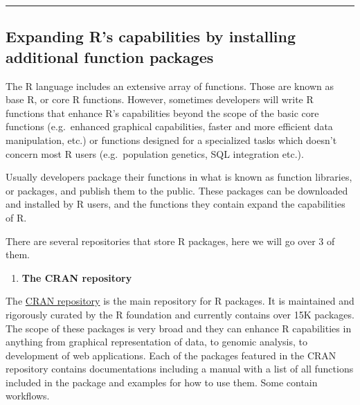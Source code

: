 \documentclass[
]{book}
\providecommand{\tightlist}{%
  \setlength{\itemsep}{0pt}\setlength{\parskip}{0pt}}
\theoremstyle{definition}
\theoremstyle{definition}
\theoremstyle{definition}
\theoremstyle{definition}
\theoremstyle{remark}
\begin{document}
\begin{center}\rule{0.5\linewidth}{0.5pt}\end{center}

\hypertarget{expanding-rs-capabilities-by-installing-additional-function-packages}{%
\subsection*{\texorpdfstring{\textbf{Expanding R's capabilities by installing additional function packages}}{Expanding R's capabilities by installing additional function packages}}\label{expanding-rs-capabilities-by-installing-additional-function-packages}}

The R language includes an extensive array of functions. Those are known as base R, or core R functions. However,
sometimes developers will write R functions that enhance R's capabilities beyond the scope of the basic core
functions (e.g.~enhanced graphical capabilities, faster and more efficient data manipulation, etc.) or functions
designed for a specialized tasks which doesn't concern most R users (e.g.~population genetics, SQL integration etc.).

Usually developers package their functions in what is known as function libraries, or packages, and publish them to
the public. These packages can be downloaded and installed by R users, and the functions they contain expand the
capabilities of R.

There are several repositories that store R packages, here we will go over 3 of them.

\begin{enumerate}
\def\labelenumi{\arabic{enumi}.}
\tightlist
\item
  \textbf{The CRAN repository}
\end{enumerate}

The \href{https://cran.r-project.org/web/packages/available_packages_by_name.html}{CRAN repository} is the main repository for R
packages. It is maintained and rigorously curated by the R foundation and currently contains over 15K packages. The scope
of these packages is very broad and they can enhance R capabilities in anything from graphical representation of data, to
genomic analysis, to development of web applications. Each of the packages featured in the CRAN repository contains
documentations including a manual with a list of all functions included in the package and examples for how to use them.
Some contain workflows.
\end{document}
